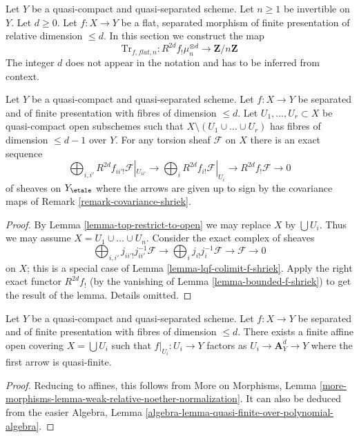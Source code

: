 \noindent
Let $Y$ be a quasi-compact and quasi-separated scheme.
Let $n \geq 1$ be invertible on $Y$. Let $d \geq 0$.
Let $f : X \to Y$ be a flat, separated morphism of finite presentation
of relative dimension $\leq d$. In this section we construct the map
$$
\text{Tr}_{f, \mathit{flat}, n} :
R^{2d}f_!\mu_n^{\otimes d}
\longrightarrow
\mathbf{Z}/n\mathbf{Z}
$$
The integer $d$ does not appear in the notation and has to be
inferred from context.

\begin{lemma}
\label{lemma-covering-right-exact}
Let $Y$ be a quasi-compact and quasi-separated scheme.
Let $f : X \to Y$ be separated and of finite presentation
with fibres of dimension $\leq d$. Let $U_1, \ldots, U_r \subset X$
be quasi-compact open subschemes such that
$X \setminus (U_1 \cup \ldots \cup U_r)$
has fibres of dimension $\leq d - 1$ over $Y$.
For any torsion sheaf $\mathcal{F}$ on $X$ there is an
exact sequence
$$
\bigoplus\nolimits_{i, i'} R^{2d}f_{ii'!}\mathcal{F}|_{U_{ii'}}
\to
\bigoplus\nolimits_i R^{2d}f_{i!}\mathcal{F}|_{U_i}
\to
R^{2d}f_!\mathcal{F}
\to
0
$$
of sheaves on $Y_\etale$ where the arrows are given up to sign
by the covariance maps of Remark \ref{remark-covariance-shriek}.
\end{lemma}

\begin{proof}
By Lemma \ref{lemma-top-restrict-to-open} we may replace $X$ by $\bigcup U_i$.
Thus we may assume $X = U_1 \cup \ldots \cup U_n$.
Consider the exact complex of sheaves
$$
\bigoplus\nolimits_{i, i'} j_{ii'!}j_{ii'}^{-1}\mathcal{F}
\to
\bigoplus\nolimits_i j_{i!}j_i^{-1}\mathcal{F}
\to
\mathcal{F}
\to
0
$$
on $X$; this is a special case of Lemma \ref{lemma-lqf-colimit-f-shriek}.
Apply the right exact functor $R^{2d}f_!$ (by the vanishing of
Lemma \ref{lemma-bounded-f-shriek}) to get
the result of the lemma. Details omitted.
\end{proof}

\begin{lemma}
\label{lemma-good-covering}
Let $Y$ be a quasi-compact and quasi-separated scheme.
Let $f : X \to Y$ be separated and of finite presentation
with fibres of dimension $\leq d$. There exists a finite
affine open covering $X = \bigcup U_i$ such that $f|_{U_i} : U_i \to Y$
factors as $U_i \to \mathbf{A}^d_Y \to Y$ where the first
arrow is quasi-finite.
\end{lemma}

\begin{proof}
Reducing to affines, this follows from More on Morphisms, Lemma
\ref{more-morphisms-lemma-weak-relative-noether-normalization}.
It can also be deduced from the easier
Algebra, Lemma \ref{algebra-lemma-quasi-finite-over-polynomial-algebra}.
\end{proof}


